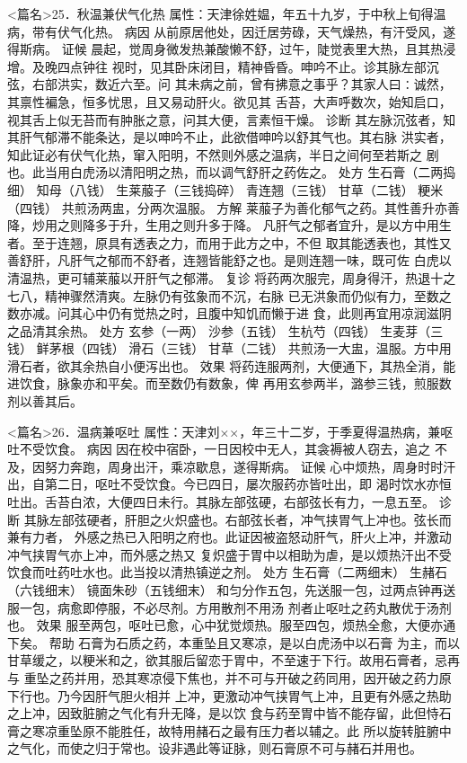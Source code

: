 \documentclass[a4paper,12pt,UTF8,twoside]{ctexbook}
\begin{document}
<篇名>25．秋温兼伏气化热
属性：天津徐姓媪，年五十九岁，于中秋上旬得温病，带有伏气化热。 
病因 从前原居他处，因迁居劳碌，天气燥热，有汗受风，遂得斯病。 
证候 晨起，觉周身微发热兼酸懒不舒，过午，陡觉表里大热，且其热浸增。及晚四点钟往 
视时，见其卧床闭目，精神昏昏。呻吟不止。诊其脉左部沉弦，右部洪实，数近六至。问 
其未病之前，曾有拂意之事乎？其家人曰∶诚然，其禀性褊急，恒多忧思，且又易动肝火。欲见其 
舌苔，大声呼数次，始知启口，视其舌上似无苔而有肿胀之意，问其大便，言素恒干燥。 
诊断 其左脉沉弦者，知其肝气郁滞不能条达，是以呻吟不止，此欲借呻吟以舒其气也。其右脉 
洪实者，知此证必有伏气化热，窜入阳明，不然则外感之温病，半日之间何至若斯之 
剧也。此当用白虎汤以清阳明之热，而以调气舒肝之药佐之。 
处方 生石膏（二两捣细） 知母（八钱） 生莱菔子（三钱捣碎） 青连翘（三钱） 
甘草（二钱） 粳米（四钱） 
共煎汤两盅，分两次温服。 
方解 莱菔子为善化郁气之药。其性善升亦善降，炒用之则降多于升，生用之则升多于降。 
凡肝气之郁者宜升，是以方中用生者。至于连翘，原具有透表之力，而用于此方之中，不但 
取其能透表也，其性又善舒肝，凡肝气之郁而不舒者，连翘皆能舒之也。是则连翘一味，既可佐 
白虎以清温热，更可辅莱菔以开肝气之郁滞。 
复诊 将药两次服完，周身得汗，热退十之七八，精神骤然清爽。左脉仍有弦象而不沉，右脉 
已无洪象而仍似有力，至数之数亦减。问其心中仍有觉热之时，且腹中知饥而懒于进 
食，此则再宜用凉润滋阴之品清其余热。 
处方 玄参（一两） 沙参（五钱） 生杭芍（四钱） 生麦芽（三钱） 
鲜茅根（四钱） 滑石（三钱） 甘草（二钱） 
共煎汤一大盅，温服。方中用滑石者，欲其余热自小便泻出也。 
效果 将药连服两剂，大便通下，其热全消，能进饮食，脉象亦和平矣。而至数仍有数象，俾 
再用玄参两半，潞参三钱，煎服数剂以善其后。 


<篇名>26．温病兼呕吐
属性：天津刘××，年三十二岁，于季夏得温热病，兼呕吐不受饮食。 
病因 因在校中宿卧，一日因校中无人，其衾褥被人窃去，追之 
不及，因努力奔跑，周身出汗，乘凉歇息，遂得斯病。 
证候 心中烦热，周身时时汗出，自第二日，呕吐不受饮食。今已四日，屡次服药亦皆吐出，即 
渴时饮水亦恒吐出。舌苔白浓，大便四日未行。其脉左部弦硬，右部弦长有力，一息五至。 
诊断 其脉左部弦硬者，肝胆之火炽盛也。右部弦长者，冲气挟胃气上冲也。弦长而兼有力者， 
外感之热已入阳明之府也。此证因被盗怒动肝气，肝火上冲，并激动冲气挟胃气亦上冲，而外感之热又 
复炽盛于胃中以相助为虐，是以烦热汗出不受饮食而吐药吐水也。此当投以清热镇逆之剂。 
处方 生石膏（二两细末） 生赭石（六钱细末） 镜面朱砂（五钱细末） 
和匀分作五包，先送服一包，过两点钟再送服一包，病愈即停服，不必尽剂。方用散剂不用汤 
剂者止呕吐之药丸散优于汤剂也。 
效果 服至两包，呕吐已愈，心中犹觉烦热。服至四包，烦热全愈，大便亦通下矣。 
帮助 石膏为石质之药，本重坠且又寒凉，是以白虎汤中以石膏 
为主，而以甘草缓之，以粳米和之，欲其服后留恋于胃中，不至速于下行。故用石膏者，忌再与 
重坠之药并用，恐其寒凉侵下焦也，并不可与开破之药同用，因开破之药力原下行也。乃今因肝气胆火相并 
上冲，更激动冲气挟胃气上冲，且更有外感之热助之上冲，因致脏腑之气化有升无降，是以饮 
食与药至胃中皆不能存留，此但恃石膏之寒凉重坠原不能胜任，故特用赭石之最有压力者以辅之。此 
所以旋转脏腑中之气化，而使之归于常也。设非遇此等证脉，则石膏原不可与赭石并用也。 
\end{document}
